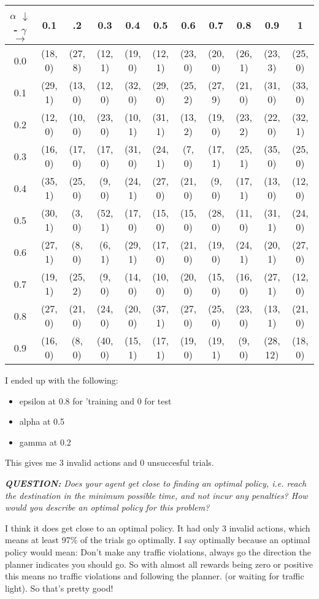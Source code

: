 \documentclass[11pt]{article}
\begin{document}
 \begin{center}
 \tabcolsep=0.05cm
 \begin{tabular}{ c || c | c | c | c | c | c | c | c | c | c }
 $\alpha$ $\downarrow$ - $\gamma$ $\rightarrow$ & 0.1&.2&0.3&0.4&0.5&0.6&0.7 & 0.8 & 0.9 & 1 \\
 \hline
 \hline
0.0 & (18, 0) & (27, 8) & (12, 1) & (19, 0) & (12, 1) & (23, 0) & (20, 0) & (26, 1) & (23, 3) & (25, 0)\\
0.1 & (29, 1) & (13, 0) & (12, 0) & (32, 0) & (29, 0) & (25, 2) & (27, 9) & (21, 0) & (31, 0) & (33, 0)\\
0.2 & (12, 0) & (10, 0) & (23, 0) & (10, 1) & (31, 1) & (13, 2) & (19, 0) & (23, 2) & (22, 0) & (32, 1)\\
0.3 & (16, 0) & (17, 0) & (17, 0) & (31, 0) & (24, 1) & (7, 0) & (17, 1) & (25, 1) & (35, 0) & (25, 0)\\
0.4 & (35, 1) & (25, 0) & (9, 0) & (24, 1) & (27, 0) & (21, 0) & (9, 0) & (17, 1) & (13, 0) & (12, 0)\\
0.5 & (30, 1) & (3, 0) & (52, 1) & (17, 0) & (15, 0) & (15, 0) & (28, 0) & (11, 0) & (31, 1) & (24, 0)\\
0.6 & (27, 1) & (8, 0) & (6, 1) & (29, 1) & (17, 0) & (21, 0) & (19, 0) & (24, 1) & (20, 1) & (27, 0)\\
0.7 & (19, 1) & (25, 2) & (9, 0) & (14, 0) & (10, 0) & (20, 0) & (15, 0) & (16, 0) & (27, 1) & (12, 0)\\
0.8 & (27, 0) & (21, 0) & (24, 0) & (20, 0) & (37, 1) & (27, 0) & (25, 0) & (23, 0) & (13, 1) & (21, 0)\\
0.9 & (16, 0) & (8, 0) & (40, 0) & (15, 1) & (17, 1) & (19, 0) & (19, 1) & (9, 0) & (28, 12) & (18, 0)
 \end{tabular}
 \end{center}
I ended up with the following:
\begin{itemize}
\item epsilon at 0.8 for 'training and 0 for test
\item alpha at 0.5
\item gamma at 0.2
\end{itemize}

This gives me 3 invalid actions and 0 unsuccesful trials. 

\begin{center}
\textit{\textbf{QUESTION:} Does your agent get close to finding an optimal policy, i.e. reach the destination in the minimum possible time, and not incur any penalties? How would you describe an optimal policy for this problem?}
\end{center}

I think it does get close to an optimal policy. It had only 3 invalid actions, which means at least 97\% of the trials go optimally. I say optimally because an optimal policy would mean: Don't make any traffic violations, always go the direction the planner indicates you should go. So with almost all rewards being zero or positive this  means no traffic violations and following the planner. (or waiting for traffic light). So that's pretty good!
\end{document}
